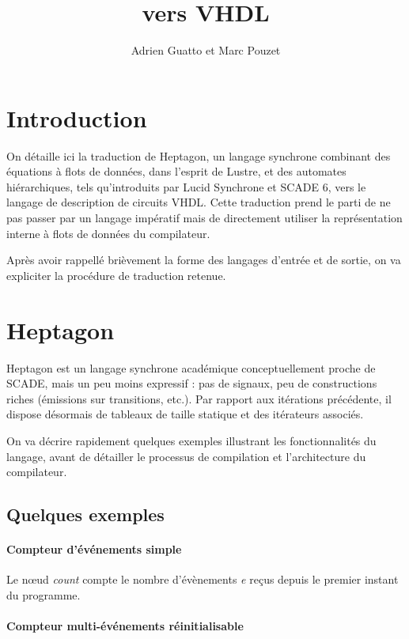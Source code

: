\documentclass[9pt,a4paper]{article}
\title{\LANG{} vers VHDL}
\author{Adrien Guatto et Marc Pouzet}
\newcommand{\LANG}{Heptagon}
\begin{document}
\maketitle

\section{Introduction}

On détaille ici la traduction de \LANG{}, un langage synchrone combinant des
équations à flots de données, dans l'esprit de Lustre, et des automates
hiérarchiques, tels qu'introduits par Lucid Synchrone et SCADE 6, vers le
langage de description de circuits VHDL. Cette traduction prend le parti de ne
pas passer par un langage impératif mais de directement utiliser la
représentation interne à flots de données du compilateur.

Après avoir rappellé brièvement la forme des langages d'entrée et de sortie, on
va expliciter la procédure de traduction retenue.

\section{\LANG{}}

\LANG{} est un langage synchrone académique conceptuellement proche de SCADE,
mais un peu moins expressif : pas de signaux, peu de constructions riches
(émissions sur transitions, etc.). Par rapport aux itérations précédente, il
dispose désormais de tableaux de taille statique et des itérateurs associés.

On va décrire rapidement quelques exemples illustrant les fonctionnalités du
langage, avant de détailler le processus de compilation et l'architecture du
compilateur.

\subsection{Quelques exemples}

\paragraph{Compteur d'événements simple}



Le nœud \textit{count} compte le nombre d'évènements \textit{e} reçus depuis le
premier instant du programme.

\paragraph{Compteur multi-événements réinitialisable}
\end{document}
